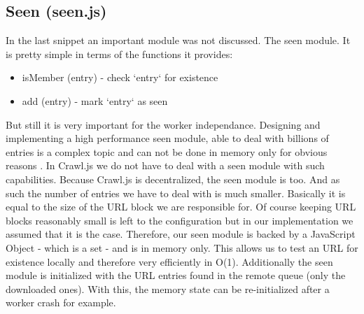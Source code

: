 \subsection{Seen (seen.js)}
In the last snippet an important module was not discussed. The seen module. It is pretty simple in terms of the functions it provides:
\begin{itemize}
  \item isMember (entry) - check `entry` for existence
  \item add (entry) - mark `entry` as seen
\end{itemize}
But still it is very important for the worker independance. Designing and implementing a high performance seen module, able to deal with billions of entries is a complex topic and can not be done in memory only for obvious reasons \cite{hp_crawler}. In Crawl.js we do not have to deal with a seen module with such capabilities. Because Crawl.js is decentralized, the seen module is too. And as such the number of entries we have to deal with is much smaller. Basically it is equal to the size of the URL block we are responsible for. Of course keeping URL blocks reasonably small is left to the configuration but in our implementation we assumed that it is the case.
\newline
\newline
Therefore, our seen module is backed by a JavaScript Object - which is a set - and is in memory only. This allows us to test an URL for existence locally and therefore very efficiently in O(1). Additionally the seen module is initialized with the URL entries found in the remote queue (only the downloaded ones). With this, the memory state can be re-initialized after a worker crash for example. 


